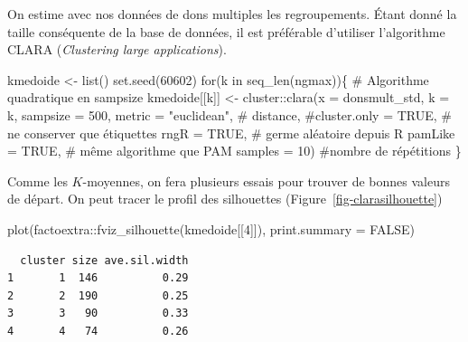 \documentclass[
  11pt,
  letterpaper,
]{scrbook}
\newenvironment{Shaded}{\begin{snugshade}}{\end{snugshade}}
\newcommand{\AttributeTok}[1]{\textcolor[rgb]{0.40,0.45,0.13}{#1}}
\newcommand{\CommentTok}[1]{\textcolor[rgb]{0.37,0.37,0.37}{#1}}
\newcommand{\ConstantTok}[1]{\textcolor[rgb]{0.56,0.35,0.01}{#1}}
\newcommand{\ControlFlowTok}[1]{\textcolor[rgb]{0.00,0.23,0.31}{#1}}
\newcommand{\DecValTok}[1]{\textcolor[rgb]{0.68,0.00,0.00}{#1}}
\newcommand{\FunctionTok}[1]{\textcolor[rgb]{0.28,0.35,0.67}{#1}}
\newcommand{\NormalTok}[1]{\textcolor[rgb]{0.00,0.23,0.31}{#1}}
\newcommand{\OtherTok}[1]{\textcolor[rgb]{0.00,0.23,0.31}{#1}}
\newcommand{\SpecialCharTok}[1]{\textcolor[rgb]{0.37,0.37,0.37}{#1}}
\newcommand{\StringTok}[1]{\textcolor[rgb]{0.13,0.47,0.30}{#1}}
\theoremstyle{definition}
\theoremstyle{remark}
\begin{document}
On estime avec nos données de dons multiples les regroupements. Étant
donné la taille conséquente de la base de données, il est préférable
d'utiliser l'algorithme CLARA (\emph{Clustering large applications}).

\begin{Shaded}
\begin{Highlighting}[]
\NormalTok{kmedoide }\OtherTok{\textless{}{-}} \FunctionTok{list}\NormalTok{()}
\FunctionTok{set.seed}\NormalTok{(}\DecValTok{60602}\NormalTok{)}
\ControlFlowTok{for}\NormalTok{(k }\ControlFlowTok{in} \FunctionTok{seq\_len}\NormalTok{(ngmax))\{}
  \CommentTok{\# Algorithme quadratique en sampsize}
\NormalTok{kmedoide[[k]] }\OtherTok{\textless{}{-}}\NormalTok{ cluster}\SpecialCharTok{::}\FunctionTok{clara}\NormalTok{(}\AttributeTok{x =}\NormalTok{ donsmult\_std,}
               \AttributeTok{k =}\NormalTok{ k,}
               \AttributeTok{sampsize =} \DecValTok{500}\NormalTok{,}
               \AttributeTok{metric =} \StringTok{"euclidean"}\NormalTok{, }\CommentTok{\# distance,}
               \CommentTok{\#cluster.only = TRUE, \# ne conserver que étiquettes}
               \AttributeTok{rngR =} \ConstantTok{TRUE}\NormalTok{, }\CommentTok{\# germe aléatoire depuis R}
               \AttributeTok{pamLike =} \ConstantTok{TRUE}\NormalTok{, }\CommentTok{\# même algorithme que PAM}
               \AttributeTok{samples =} \DecValTok{10}\NormalTok{) }\CommentTok{\#nombre de répétitions}
\NormalTok{\}}
\end{Highlighting}
\end{Shaded}

Comme les \(K\)-moyennes, on fera plusieurs essais pour trouver de
bonnes valeurs de départ. On peut tracer le profil des silhouettes
(Figure~\ref{fig-clarasilhouette})

\begin{Shaded}
\begin{Highlighting}[]
\FunctionTok{plot}\NormalTok{(factoextra}\SpecialCharTok{::}\FunctionTok{fviz\_silhouette}\NormalTok{(kmedoide[[}\DecValTok{4}\NormalTok{]]),}
     \AttributeTok{print.summary =} \ConstantTok{FALSE}\NormalTok{)}
\end{Highlighting}
\end{Shaded}

\begin{verbatim}
  cluster size ave.sil.width
1       1  146          0.29
2       2  190          0.25
3       3   90          0.33
4       4   74          0.26
\end{verbatim}
\end{document}

